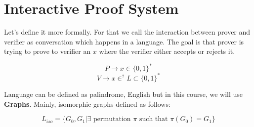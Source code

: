 \documentclass{article}
\begin{document}
\section{Interactive Proof System}

Let's define it more formally. For that we call the interaction between prover and verifier as conversation which happens in a language. The goal is that prover is trying to prove to verifier an $x$ where the verifier either accepts or rejects it.

$$ P \rightarrow x \in \{0,1\}^* $$
$$ V \rightarrow x \in^{?} L \subset \{0,1\}^* $$

Language can be defined as palindrome, English but in this course, we will use \textbf{Graphs}. Mainly, isomorphic graphs defined as follows:

$$L_{iso} = \{G_0, G_1 | \exists \text{ permutation } \pi \text{ such that } \pi(G_0) = G_1\}$$

% 
% 
\end{document}
